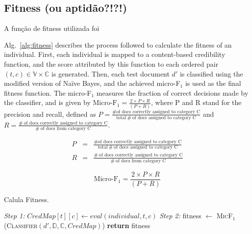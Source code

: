 \subsection{Fitness (ou aptidão?!?!)}
\label{subsec:Fitness}

A função de fitness utilizada foi


Alg.~\ref{alg:fitness} describes the process followed to calculate the fitness of an individual.
First, each individual is mapped to a content-based credibility function, and the score attributed by this function to each ordered pair $(t, c) \in \mathbb{V} \times \mathbb{C}$ is generated.
Then, each test document $d'$ is classified using the modified version of Na\"{i}ve Bayes, and the achieved micro-F$_1$ is used as the final fitness function. The micro-F$_1$ measures the fraction of correct decisions made by the classifier, and is given by
$\text{Micro-F}_1 = \frac{2 \times P \times R}{(P + R)}$, where P and R stand for the precision and recall, defined as
$P = \frac{\# \text{of docs correctly assigned to category C}}{\text{total} \: \# \: \text{of docs assigned to category C}}$ and
$R = \frac{\# \: \text{of docs correctly assigned to category C}}{\# \: \text{of docs from category C}}$.

\begin{eqnarray}
P & = & \frac{\# \text{of docs correctly assigned to category C}} {\text{total} \: \# \: \text{of docs assigned to category C}} \\
R & = & \frac{\# \: \text{of docs correctly assigned to category C}}{\# \: \text{of docs from category C}}                      
\end{eqnarray}

\begin{equation}
\text{Micro-F}_1 = \frac{2 \times P \times R}{(P + R)}
\end{equation}

\algrenewcommand{}
\algrenewcommand{}
\algrenewcommand{}
\algrenewcommand{} %

\begin{algorithm}
\centering
\caption{Calula Fitness.}
\label{alg:fitness}
\begin{algorithmic}[1]
{
  \State \textit{Step 1:}
      \State $CredMap[t][c] \gets eval(individual, t, c)$
    \EndFor
  \EndFor
  \State \textit{Step 2:}
  \State fitness $\gets$ \textsc{MicF$_1$}(\textsc{Classifier}$(d', \mathbb{D}, \mathbb{C}, CredMap)$)
  \State \textbf{return} fitness
\EndFunction
}
\end{algorithmic}
\end{algorithm}



